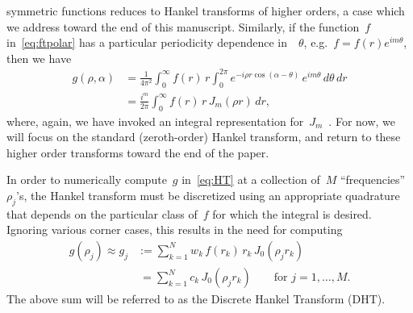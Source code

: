 symmetric functions reduces to Hankel transforms of higher orders, a case which
we address toward the end of this manuscript. Similarly, if the function~$f$
in~\eqref{eq:ftpolar} has a particular periodicity dependence in~~$\theta$,
e.g.~$f = f(r)e^{im\theta}$, then we have
\begin{equation}
  \begin{aligned}
  g(\rho,\alpha) &= \frac{1}{4\pi^2} \int_0^\infty f(r) \, r \int_0^{2\pi} 
  e^{-i \rho r \cos(\alpha - \theta) } \, e^{im\theta}  \, d\theta \, dr \\
  &= \frac{i^m}{2\pi} \int_0^\infty f(r) \, r \, J_m(\rho r)  \, dr,
  \end{aligned}
\end{equation}
where, again, we have invoked an integral representation
for~$J_m$~\cite{olver2010nist}. For now, we will focus on the standard
(zeroth-order) Hankel transform, and return to these higher order transforms
toward the end of the paper.

In order to numerically compute~$g$ in~\eqref{eq:HT} at a collection of~$M$
``frequencies''~$\rho_j$'s, the Hankel transform must be discretized using an
appropriate quadrature that depends on the particular class of~$f$ for which the
integral is desired. Ignoring various corner cases, this results in the need for
computing
\begin{equation} \label{eq:DHT}
  \begin{aligned}
  g(\rho_j) \approx 
  g_j &:= \sum_{k=1}^N w_k \, f(r_k) \, r_k \, J_0(\rho_j r_k) \\
  &\ = \sum_{k=1}^N c_k \, J_0(\rho_j r_k)
   \qquad \text{for } j = 1, \ldots, M.
  \end{aligned}
\end{equation}
The above sum will be referred to as the Discrete Hankel Transform (DHT). 

